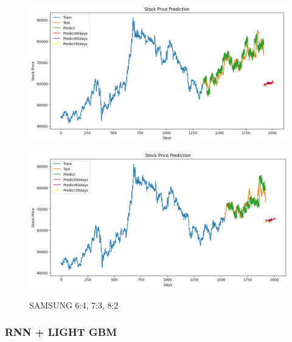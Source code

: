 \documentclass{article}
\begin{document}
\begin{multicols}{2}
\begin{figure}[H]
\begin{minipage}{0.15\textwidth}
    \label{fig:1}
    \end{minipage}%
    \begin{minipage}{0.15\textwidth}
    \centering
    \includegraphics[width=1\textwidth]{Image/NBeat/N_BEAT_SAMSUNG_7_3.png}
  
    \label{fig:2}
    \end{minipage}%
    \begin{minipage}{0.15\textwidth}
    \centering
    \includegraphics[width=1\textwidth]{Image/NBeat/N_BEAT_SAMSUNG_8_2.png}

    \label{fig:3}
    \end{minipage}
    \caption{SAMSUNG  6:4, 7:3, 8:2 }
\end{figure}

\subsubsection{RNN + LIGHT GBM}




\end{multicols}
\end{document}
